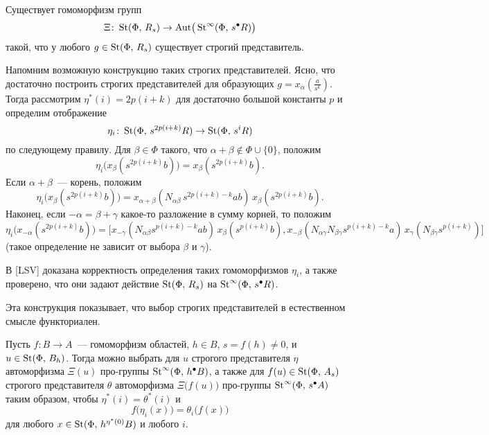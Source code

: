 \documentclass[12pt,a4paper]{article}
\begin{document}
\begin{theorem}[Воронецкий]
\label{vor}
Существует гомоморфизм групп 
$$
\Xi\colon\mathop{\mathrm{St}}\nolimits(\Phi,\,R_s)\rightarrow\mathrm{Aut}\big(\mathop{\mathrm{St}}\nolimits^\infty(\Phi,\,s^\bullet R)\big)
$$
такой, что у любого $g\in\mathop{\mathrm{St}}\nolimits(\Phi,\,R_s)$ существует строгий представитель.
\end{theorem}

Напомним возможную конструкцию таких строгих представителей. Ясно, что достаточно построить строгих представителей для образующих $g=x_\alpha(\frac a {s^k})$. Тогда рассмотрим $\eta^*(i) = 2p(i+k)$ для достаточно большой константы \(p\) и определим отображение
$$
\eta_i\colon\mathop{\mathrm{St}}\nolimits(\Phi,\,s^{2p(i+k)}R)\rightarrow\mathop{\mathrm{St}}\nolimits(\Phi,\,s^iR)
$$
по следующему правилу. Для $\beta\in\Phi$ такого, что \(\alpha + \beta \notin \Phi \cup \{0\}\), положим 
$$\eta_i\bigl(x_\beta(s^{2p(i+k)}b)\bigr)=x_\beta(s^{2p(i+k)}b).$$
Если $\alpha+\beta$~--- корень, положим
$$
\eta_i\bigl(x_\beta(s^{2p(i+k)}b)\bigr)=x_{\alpha+\beta}(N_{\alpha \beta}\,s^{2p(i + k) - k}ab)\, x_\beta(s^{2p(i + k)}b).
$$
Наконец, если $-\alpha = \beta + \gamma$ какое-то разложение в сумму корней, то положим
$$
\eta_i\bigl(x_{-\alpha}(s^{2p(i + k)} b)\bigr) = \bigl[x_{-\gamma}(N_{\alpha\beta} s^{p(i + k) - k} ab)\,
x_\beta(s^{p(i + k)} b),
x_{-\beta}(N_{\alpha\gamma} N_{\beta\gamma} s^{p(i + k) - k} a)\,
x_\gamma(N_{\beta \gamma} s^{p(i + k)})\bigr]
$$
(такое определение не зависит от выбора $\beta$ и $\gamma$).

В [LSV] доказана корректность определения таких гомоморфизмов $\eta_i$, а также проверено, что они задают действие $\mathop{\mathrm{St}}\nolimits(\Phi,\,R_s)$ на $\mathop{\mathrm{St}}\nolimits^\infty(\Phi,\,s^\bullet R)$.

Эта конструкция показывает, что выбор строгих представителей в естественном смысле функториален. 
\begin{corollary}
\label{vorcor}
Пусть $f\colon B\rightarrow A$~--- гомоморфизм областей, $h\in B$, $s=f(h)\neq0$, и $u\in\mathop{\mathrm{St}}\nolimits(\Phi,\,B_h)$. Тогда можно выбрать для $u$ строгого представителя $\eta$ автоморфизма $\Xi(u)$ про-группы $\mathop{\mathrm{St}}\nolimits^\infty(\Phi,\,h^\bullet B)$, а также для $f(u)\in\mathop{\mathrm{St}}\nolimits(\Phi,\,A_s)$ строгого представителя $\theta$ автоморфизма $\Xi\big(f(u)\big)$ про-группы $\mathop{\mathrm{St}}\nolimits^\infty(\Phi,\,s^\bullet A)$ таким образом, чтобы $\eta^*(i)=\theta^*(i)$ и
$$f\bigl(\eta_i(x)\bigr) = \theta_i\bigl(f(x)\bigr)$$
для любого $x\in\mathop{\mathrm{St}}\nolimits(\Phi,\,h^{\eta^*(0)}B)$ и любого \(i\).
\end{corollary}
\end{document}
